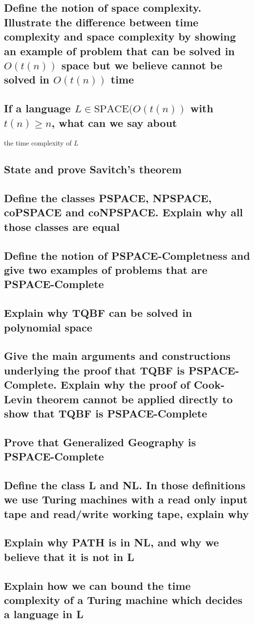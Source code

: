 \documentclass[main.tex]{subfiles}
\begin{document}
\subsection{Define the notion of space complexity. Illustrate the difference between time complexity and space complexity by showing an example of problem that can be solved in $O(t(n))$ space but we believe cannot be solved in $O(t(n))$ time}

\subsection{If a language $L \in \text{SPACE}(O(t(n))$ with $t(n) \geq n$, what can we say about}
the time complexity of $L$

\subsection{State and prove Savitch’s theorem}

\subsection{Define the classes PSPACE, NPSPACE, coPSPACE and coNPSPACE. Explain why all those classes are equal}

\subsection{Define the notion of PSPACE-Completness and give two examples of problems that are PSPACE-Complete}

\subsection{Explain why TQBF can be solved in polynomial space}

\subsection{Give the main arguments and constructions underlying the proof that TQBF is PSPACE-Complete. Explain why the proof of Cook-Levin theorem cannot be applied directly to show that TQBF is PSPACE-Complete}

\subsection{Prove that Generalized Geography is PSPACE-Complete}

\subsection{Define the class L and NL. In those definitions we use Turing machines with a read only input tape and read/write working tape, explain why}

\subsection{Explain why PATH is in NL, and why we believe that it is not in L}

\subsection{Explain how we can bound the time complexity of a Turing machine which decides a language in L}
\end{document}
